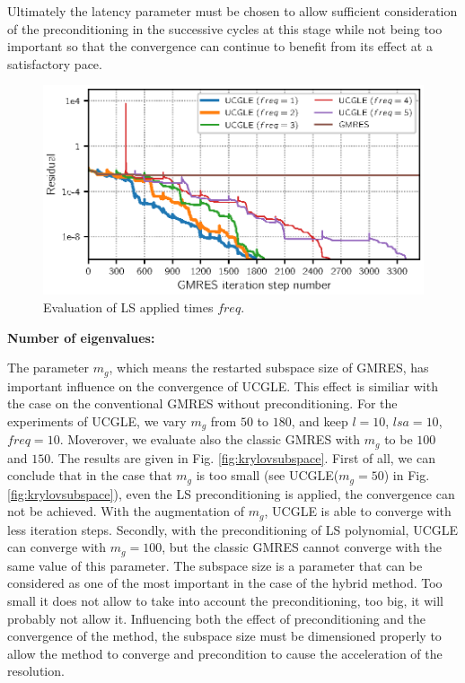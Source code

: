 Ultimately the latency parameter must be chosen to allow sufficient consideration of the preconditioning in the successive cycles at this stage while not being too important so that the convergence can continue to benefit from its effect at a satisfactory pace.

\begin{figure}[htbp]
	\centering
	\includegraphics[width=6.2in]{fig/conv_lsfreq.eps}
	\caption{Evaluation of LS applied times $freq$.}
	\label{fig:Lsfreq}
\end{figure}


\textbf{Number of eigenvalues: }

The parameter $m_g$, which means the restarted subspace size of GMRES, has important influence on the convergence of UCGLE.  This effect is similiar with the case on the conventional GMRES without preconditioning. For the experiments of UCGLE, we vary $m_g$ from $50$ to $180$, and keep $l=10$, $lsa=10$, $freq=10$. Moverover, we evaluate also the classic GMRES with $m_g$ to be $100$ and $150$. The results are given in Fig. \ref{fig:krylovsubspace}. First of all, we can conclude that in the case that $m_g$ is too small (see UCGLE($m_g=50$) in  Fig. \ref{fig:krylovsubspace}), even the LS preconditioning is applied, the convergence can not be achieved. With the augmentation of $m_g$, UCGLE is able to converge with less iteration steps. Secondly, with the preconditioning of LS polynomial, UCGLE can converge with $m_g=100$, but the classic GMRES cannot converge with the same value of this parameter.
The subspace size is a parameter that can be considered as one of the most important in the case of the hybrid method. Too small it does not allow to take into account the preconditioning, too big, it will probably not allow it. Influencing both the effect of preconditioning and the convergence of the method, the subspace size must be dimensioned properly to allow the method to converge and precondition to cause the acceleration of the resolution.

